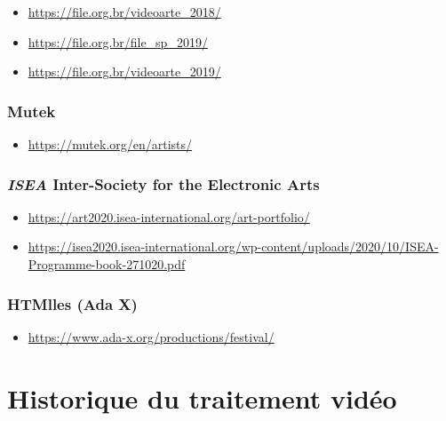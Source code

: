 \documentclass[
]{book}
\providecommand{\tightlist}{%
  \setlength{\itemsep}{0pt}\setlength{\parskip}{0pt}}
\begin{document}
\begin{itemize}
\tightlist
\item
  \url{https://file.org.br/videoarte_2018/}
\item
  \url{https://file.org.br/file_sp_2019/}
\item
  \url{https://file.org.br/videoarte_2019/}
\end{itemize}

\hypertarget{mutek}{%
\subsection{Mutek}\label{mutek}}

\begin{itemize}
\tightlist
\item
  \url{https://mutek.org/en/artists/}
\end{itemize}

\hypertarget{isea-inter-society-for-the-electronic-arts}{%
\subsection{\texorpdfstring{\emph{ISEA} Inter-Society for the Electronic Arts}{ISEA Inter-Society for the Electronic Arts}}\label{isea-inter-society-for-the-electronic-arts}}

\begin{itemize}
\tightlist
\item
  \url{https://art2020.isea-international.org/art-portfolio/}
\item
  \url{https://isea2020.isea-international.org/wp-content/uploads/2020/10/ISEA-Programme-book-271020.pdf}
\end{itemize}

\hypertarget{htmlles-ada-x}{%
\subsection{HTMlles (Ada X)}\label{htmlles-ada-x}}

\begin{itemize}
\tightlist
\item
  \url{https://www.ada-x.org/productions/festival/}
\end{itemize}

\hypertarget{historique}{%
\chapter{Historique du traitement vidéo}\label{historique}}
\end{document}
